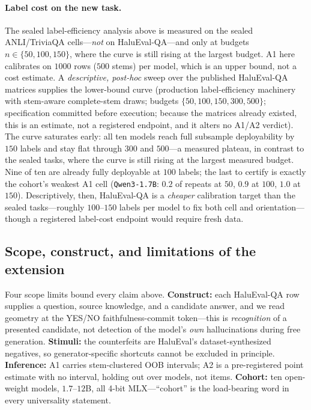 \documentclass[11pt]{article}
\begin{document}
\paragraph{Label cost on the new task.} The sealed label-efficiency analysis above is measured on
the sealed ANLI/TriviaQA cells---\emph{not} on HaluEval-QA---and only at budgets
$n\in\{50,100,150\}$, where the curve is still rising at the largest budget. A1 here calibrates on
$1000$ rows ($500$ stems) per model, which is an upper bound, not a cost estimate. A
\emph{descriptive, post-hoc} sweep over the published HaluEval-QA matrices supplies the
lower-bound curve (production label-efficiency machinery with stem-aware complete-stem draws;
budgets $\{50,100,150,300,500\}$; specification committed before execution; because the matrices
already existed, this is an estimate, not a registered endpoint, and it alters no A1/A2 verdict).
The curve saturates early: all ten models reach full subsample deployability by $150$ labels and
stay flat through $300$ and $500$---a measured plateau, in contrast to the sealed tasks, where the
curve is still rising at the largest measured budget. Nine of ten are already fully deployable at
$100$ labels; the last to certify is exactly the cohort's weakest A1 cell (\texttt{Qwen3-1.7B}:
$0.2$ of repeats at $50$, $0.9$ at $100$, $1.0$ at $150$). Descriptively, then, HaluEval-QA is a
\emph{cheaper} calibration target than the sealed tasks---roughly $100$--$150$ labels per model to
fix both cell and orientation---though a registered label-cost endpoint would require fresh data.

\subsection{Scope, construct, and limitations of the extension}

Four scope limits bound every claim above. \textbf{Construct:} each HaluEval-QA row supplies a
question, source knowledge, and a candidate answer, and we read geometry at the YES/NO
faithfulness-commit token---this is \emph{recognition} of a presented candidate, not detection of the
model's \emph{own} hallucinations during free generation. \textbf{Stimuli:} the counterfeits are
HaluEval's dataset-synthesized negatives, so generator-specific shortcuts cannot be excluded in
principle. \textbf{Inference:} A1 carries stem-clustered OOB intervals; A2 is a pre-registered point
estimate with no interval, holding out over models, not items. \textbf{Cohort:} ten open-weight
models, $1.7$--$12$B, all 4-bit MLX---``cohort'' is the load-bearing word in every universality
statement.
\end{document}
